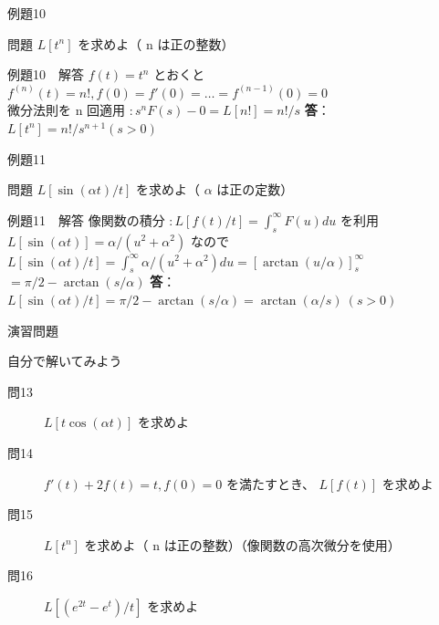 \documentclass[professionalfonts]{beamer}
\begin{document}
\begin{frame}{例題10}
  \begin{exampleblock}{問題}
    $L[t^n]$ を求めよ（ n は正の整数）\\[2pt]
  \end{exampleblock}
\end{frame}

\begin{frame}{例題10　解答}
  $f(t) = t^n$ とおくと\\[4pt]
  $f^{(n)}(t) = n!, f(0) = f'(0) = \ldots = f^{(n-1)}(0) = 0$\\[4pt]
  微分法則を n 回適用 $: s^n F(s) - 0 = L[n!] = n!/s$
  \medskip\textbf{答}：$L[t^n] = n!/s^{n+1}  (s > 0)$
\end{frame}

\begin{frame}{例題11}
  \begin{exampleblock}{問題}
    $L[\sin(\alpha t)/t]$ を求めよ（ $\alpha$ は正の定数）\\[2pt]
  \end{exampleblock}
\end{frame}

\begin{frame}{例題11　解答}
  像関数の積分 $: L[f(t)/t] = \int_{s}^\infty F(u)du$ を利用\\[4pt]
  $L[\sin(\alpha t)] = \alpha/(u^{2}+\alpha^{2})$ なので\\[4pt]
  $L[\sin(\alpha t)/t] = \int_{s}^\infty \alpha/(u^{2}+\alpha^{2}) du = [\arctan(u/\alpha)]_{s}^\infty$\\[4pt]
  $= \pi/2 - \arctan(s/\alpha)$
  \medskip\textbf{答}：$L[\sin(\alpha t)/t] = \pi/2 - \arctan(s/\alpha) = \arctan(\alpha/s) \ (s > 0)$
\end{frame}

\begin{frame}{演習問題}
  \begin{exampleblock}{自分で解いてみよう}
  \begin{description}
    \item[問13] $L[t \cos(\alpha t)]$ を求めよ
    \item[問14] $f'(t)+2f(t)=t, f(0)=0$ を満たすとき、 $L[f(t)]$ を求めよ
    \item[問15] $L[t^n]$ を求めよ（ n は正の整数）（像関数の高次微分を使用）
    \item[問16] $L[(e^{2t} - e^t)/t]$ を求めよ
  \end{description}
  \end{exampleblock}
\end{frame}
\end{document}
